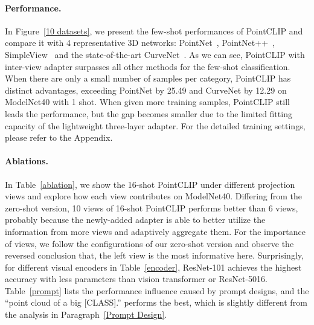 \documentclass[10pt,twocolumn,letterpaper]{article}
\begin{document}
\paragraph{Performance.} In Figure~\ref{10 datasets}, we present the few-shot performances of PointCLIP and compare it with 4 representative 3D networks: PointNet~\cite{qi2017pointnet}, PointNet++~\cite{qi2017pointnet++}, SimpleView~\cite{goyal2021revisiting} and the state-of-the-art CurveNet~\cite{muzahid2020curvenet}. As we can see, PointCLIP with inter-view adapter surpasses all other methods for the few-shot classification. When there are only a small number of samples per category, PointCLIP has distinct advantages, exceeding PointNet by 25.49 and CurveNet by 12.29 on ModelNet40 with 1 shot. When given more training samples, PointCLIP still leads the performance, but the gap becomes smaller due to the limited fitting capacity of the lightweight three-layer adapter. For the detailed training settings, please refer to the Appendix.

\vspace*{-8pt}
\paragraph{Ablations.}
\label{abfew}
In Table~\ref{ablation}, we show the 16-shot PointCLIP under different projection views and explore how each view contributes on ModelNet40. Differing from the zero-shot version, 10 views of 16-shot PointCLIP performs better than 6 views, probably because the newly-added adapter is able to better utilize the information from more views and adaptively aggregate them. For the importance of views, we follow the configurations of our zero-shot version and observe the reversed conclusion that, the left view is the most informative here. Surprisingly, for different visual encoders in Table~\ref{encoder}, ResNet-101 achieves the highest accuracy with less parameters than vision transformer or ResNet-5016. Table~\ref{prompt} lists the performance influence caused by prompt designs, and the ``point cloud of a big [CLASS].'' performs the best, which is slightly different from the analysis in Paragraph~\ref{Prompt Design}.
\end{document}
